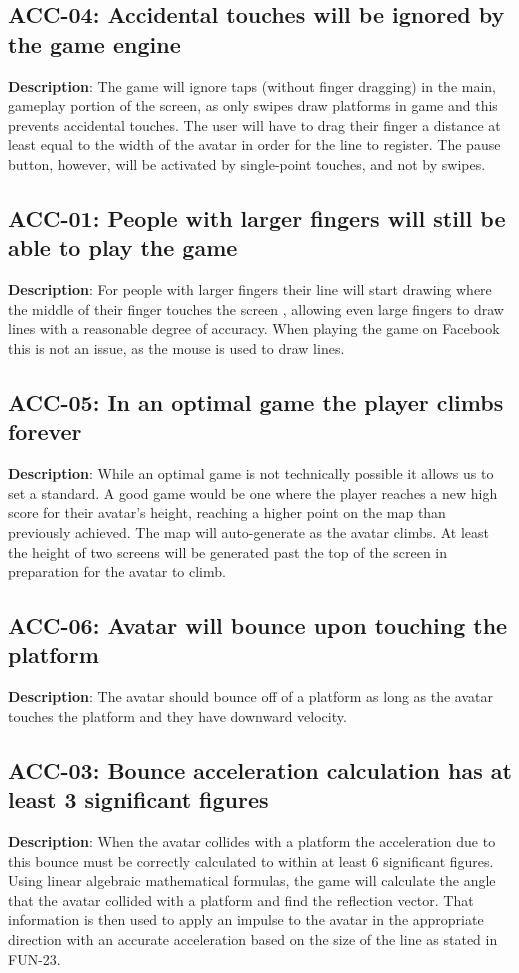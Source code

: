 \subsection{ACC-04: Accidental touches will be ignored by the game engine}
\textbf{Description}: The game will ignore taps (without finger dragging) in
the main, gameplay portion of the screen, as only swipes draw platforms
in game and this prevents accidental touches. The user will have to
drag their finger a distance at least equal to the width of the avatar
in order for the line to register. The pause button, however, will
be activated by single-point touches, and not by swipes.
\subsection{ACC-01: People with larger fingers will still be able to play the
game}
\textbf{Description}: For people with larger fingers their line will start
drawing where the middle of their finger touches the screen , allowing
even large fingers to draw lines with a reasonable degree of accuracy.
When playing the game on Facebook this is not an issue, as the mouse
is used to draw lines. 
\subsection{ACC-05: In an optimal game the player climbs forever}
\textbf{Description}: While an optimal game is not technically possible it
allows us to set a standard. A good game would be one where the player
reaches a new high score for their avatar\textquoteright{}s height,
reaching a higher point on the map than previously achieved. The map
will auto-generate as the avatar climbs. At least the height of two
screens will be generated past the top of the screen in preparation
for the avatar to climb.
\subsection{ACC-06: Avatar will bounce upon touching the platform}
\textbf{Description}: The avatar should bounce off of a platform as long as
the avatar touches the platform and they have downward velocity.
\subsection{ACC-03: Bounce acceleration calculation has at least 3 significant
figures}
\textbf{Description}: When the avatar collides with a platform the acceleration
due to this bounce must be correctly calculated to within at least
6 significant figures. Using linear algebraic mathematical formulas,
the game will calculate the angle that the avatar collided with a
platform and find the reflection vector. That information is then
used to apply an impulse to the avatar in the appropriate direction
with an accurate acceleration based on the size of the line as stated
in FUN-23.
